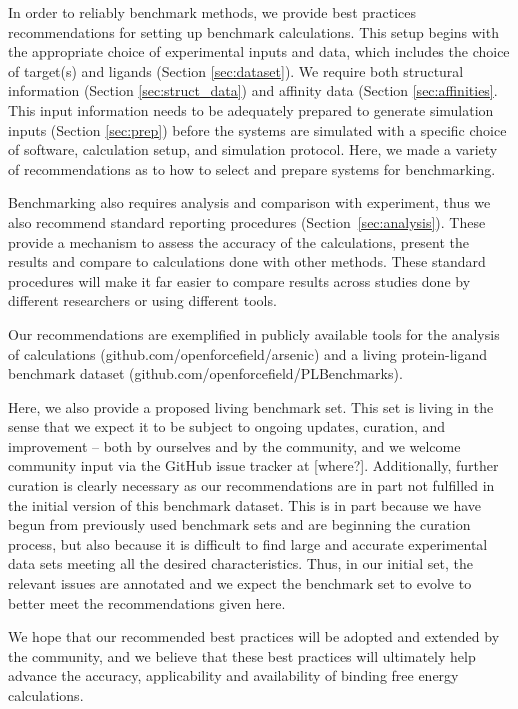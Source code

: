 \documentclass[9pt,bestpractices]{livecoms}
\begin{document}
In order to reliably benchmark methods, we provide best practices recommendations for setting up benchmark calculations.
This setup begins with the appropriate choice of experimental inputs and data, which includes 
the choice of target(s) and ligands (Section \ref{sec:dataset}). We require both
structural information (Section \ref{sec:struct_data}) and 
affinity data (Section \ref{sec:affinities}.
This input information needs to be adequately prepared to generate simulation inputs (Section \ref{sec:prep}) before the systems are simulated with a specific choice of 
software, 
calculation setup, and 
simulation protocol. Here, we made a variety of recommendations as to how to select and prepare systems for benchmarking.

Benchmarking also requires analysis and comparison with experiment, thus we also recommend standard reporting procedures (Section~\ref{sec:analysis}). These provide a mechanism to assess the accuracy of the calculations, present the results and compare to calculations done with other methods. These standard procedures will make it far easier to compare results across studies done by different researchers or using different tools.

Our recommendations are exemplified in publicly available tools for the analysis of calculations (github.com/openforcefield/arsenic)
and a living protein-ligand benchmark dataset (github.com/openforcefield/PLBenchmarks).
%

Here, we also provide a proposed living benchmark set. This set is living in the sense that we expect it to be subject to ongoing updates, curation, and improvement -- both by ourselves and by the community, and we welcome community input via the GitHub issue tracker at [where?]. Additionally, further curation is clearly necessary as our recommendations are in part not fulfilled in the initial version of this benchmark dataset. This is in part because we have begun from previously used benchmark sets and are beginning the curation process, but also because it is difficult to find large and accurate experimental data sets meeting all the desired characteristics. Thus, in our initial set, the relevant issues are annotated and we expect the benchmark set to evolve to better meet the recommendations given here.

We hope that our recommended best practices will be adopted and extended by the community, and we believe that these best practices will ultimately help advance the accuracy, applicability and availability of binding free energy calculations. 
\end{document}
